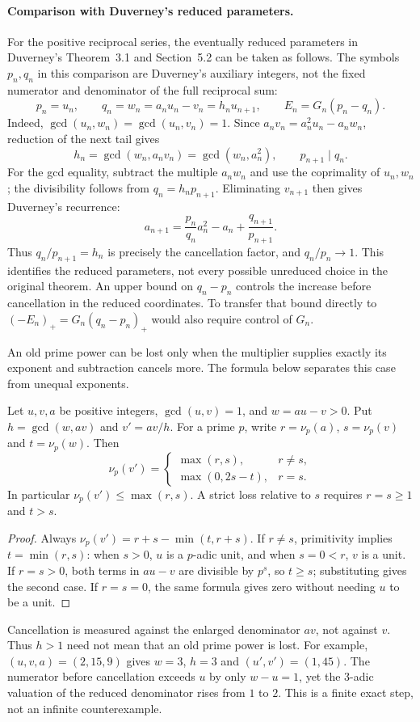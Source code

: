 \paragraph{Comparison with Duverney's reduced parameters.}
For the positive reciprocal series, the eventually reduced parameters in Duverney's
Theorem~3.1 and Section~5.2 \cite[pp.~285--286, 299--300]{duverney2001}
can be taken as follows. The symbols $p_n,q_n$ in this comparison are
Duverney's auxiliary integers, not the fixed numerator and denominator
of the full reciprocal sum:
\[
 p_n=u_n,\qquad q_n=w_n=a_nu_n-v_n=h_nu_{n+1},\qquad
 E_n=G_n(p_n-q_n).
\]
Indeed, $\gcd(u_n,w_n)=\gcd(u_n,v_n)=1$. Since
$a_nv_n=a_n^2u_n-a_nw_n$, reduction of the next tail gives
\[
 h_n=\gcd(w_n,a_nv_n)=\gcd(w_n,a_n^2),\qquad
 p_{n+1}\mid q_n.
\]
For the gcd equality, subtract the multiple $a_nw_n$ and use the
coprimality of $u_n,w_n$; the divisibility follows from
$q_n=h_np_{n+1}$. Eliminating $v_{n+1}$ then gives Duverney's recurrence:
\[
 a_{n+1}=\frac{p_n}{q_n}a_n^2-a_n+\frac{q_{n+1}}{p_{n+1}}.
\]
Thus $q_n/p_{n+1}=h_n$ is precisely the cancellation factor, and
$q_n/p_n\to1$. This identifies the reduced parameters, not every possible
unreduced choice in the original theorem. An upper bound on $q_n-p_n$ controls the increase before cancellation
in the reduced coordinates. To transfer that bound directly to
$(-E_n)_+=G_n(q_n-p_n)_+$ would also require control of $G_n$.

An old prime power can be lost only when the multiplier supplies
exactly its exponent and subtraction cancels more. The formula below
separates this case from unequal exponents.

\begin{lemma}\label{long243:res:valuationtransition}
Let $u,v,a$ be positive integers, $\gcd(u,v)=1$, and $w=au-v>0$.
Put $h=\gcd(w,av)$ and $v'=av/h$. For a prime $p$, write
$r=\nu_p(a)$, $s=\nu_p(v)$ and $t=\nu_p(w)$. Then
\[
 \nu_p(v')=
 \begin{cases}
 \max(r,s),&r\ne s,\\
 \max(0,2s-t),&r=s.
 \end{cases}
\]
In particular $\nu_p(v')\le\max(r,s)$. A strict loss relative to $s$
requires $r=s\ge1$ and $t>s$.
\end{lemma}
\begin{proof}
Always $\nu_p(v')=r+s-\min(t,r+s)$. If $r\ne s$, primitivity implies
$t=\min(r,s)$: when $s>0$, $u$ is a $p$-adic unit, and when $s=0<r$,
$v$ is a unit. If $r=s>0$, both terms in $au-v$ are divisible by $p^s$,
so $t\ge s$; substituting gives the second case. If $r=s=0$, the same
formula gives zero without needing $u$ to be a unit.
\end{proof}
Cancellation is measured against the enlarged denominator $av$, not
against $v$. Thus $h>1$ need not mean that an old prime power is lost.
For example, $(u,v,a)=(2,15,9)$ gives $w=3$, $h=3$ and
$(u',v')=(1,45)$. The numerator before cancellation exceeds $u$ by only
$w-u=1$, yet the $3$-adic valuation of the reduced denominator rises
from $1$ to $2$.
This is a finite exact step, not an infinite counterexample.

